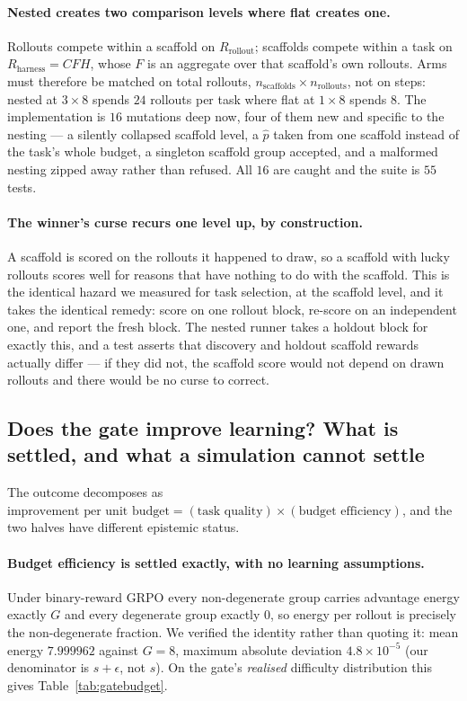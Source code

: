 \paragraph{Nested creates two comparison levels where flat creates one.} Rollouts compete
within a scaffold on $R_{\mathrm{rollout}}$; scaffolds compete within a task on
$R_{\mathrm{harness}}=CFH$, whose $F$ is an aggregate over that scaffold's own rollouts.
Arms must therefore be matched on total rollouts, $n_{\mathrm{scaffolds}}\times
n_{\mathrm{rollouts}}$, not on steps: nested at $3\times8$ spends $24$ rollouts per task
where flat at $1\times8$ spends $8$. The implementation is $16$ mutations deep now, four of
them new and specific to the nesting --- a silently collapsed scaffold level, a $\hat p$
taken from one scaffold instead of the task's whole budget, a singleton scaffold group
accepted, and a malformed nesting zipped away rather than refused. All $16$ are caught and
the suite is $55$ tests.

\paragraph{The winner's curse recurs one level up, by construction.} A scaffold is scored on
the rollouts it happened to draw, so a scaffold with lucky rollouts scores well for reasons
that have nothing to do with the scaffold. This is the identical hazard we measured for task
selection, at the scaffold level, and it takes the identical remedy: score on one rollout
block, re-score on an independent one, and report the fresh block. The nested runner takes a
holdout block for exactly this, and a test asserts that discovery and holdout scaffold
rewards actually differ --- if they did not, the scaffold score would not depend on drawn
rollouts and there would be no curse to correct.

\subsection{Does the gate improve learning? What is settled, and what a simulation cannot
settle}
\label{sec:gateoutcome}

The outcome decomposes as
$\text{improvement per unit budget} = (\text{task quality}) \times (\text{budget
efficiency})$, and the two halves have different epistemic status.

\paragraph{Budget efficiency is settled exactly, with no learning assumptions.} Under
binary-reward GRPO every non-degenerate group carries advantage energy exactly $G$ and every
degenerate group exactly $0$, so energy per rollout is precisely the non-degenerate
fraction. We verified the identity rather than quoting it: mean energy $7.999962$ against
$G=8$, maximum absolute deviation $4.8\times10^{-5}$ (our denominator is $s+\epsilon$, not
$s$). On the gate's \emph{realised} difficulty distribution this gives
Table~\ref{tab:gatebudget}.

